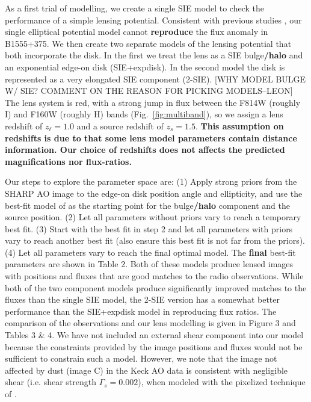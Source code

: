 \documentclass[useAMS,usenatbib]{mn2e}
\begin{document}
As a first trial of modelling, we create a single SIE model to check
the performance of a simple lensing potential. Consistent with
previous studies \citep{Marlow99, Xu14}, our single elliptical
potential model cannot \textbf{reproduce} the flux anomaly in B1555+375.  We then
create two separate models of the lensing potential that both
incorporate the disk.  In the first we treat the lens as a SIE bulge\textbf{/halo}
and an exponential edge-on disk (SIE+expdisk).  In the second model
the disk is represented as a very elongated SIE component (2-SIE). [WHY MODEL BULGE W/ SIE? COMMENT ON THE REASON FOR PICKING MODELS--LEON]
The lens system is red, with a strong jump in flux between the F814W
(roughly I) and F160W (roughly H) bands (Fig.~\ref{fig:multiband}), so
we assign a lens redshift of $z_\ell = 1.0$ and a source redshift of
$z_s =1.5$. \textbf{This assumption on redshifts is due to that some lens model parameters contain distance information. Our choice of redshifts does not affects the predicted magnifications nor flux-ratios.} 

Our steps to explore the parameter space are: (1) Apply
strong priors from the SHARP AO image to the edge-on disk position angle
and ellipticity, and use the best-fit model of \citet{Marlow99} as the
starting point for the bulge\textbf{/halo} component and the source position. (2)
Let all parameters without priors vary to reach a temporary best
fit. (3) Start with the best fit in step 2 and let all parameters with
priors vary to reach another best fit (also ensure this best fit is
not far from the priors). (4) Let all parameters vary to reach the
final optimal model.  The \textbf{final} best-fit parameters are shown in Table
2. Both of these models produce lensed images with positions and
fluxes that are good matches to the radio observations.  While both of
the two component models produce significantly improved matches to the
fluxes than the single SIE model, the 2-SIE version has a somewhat
better performance than the SIE+expdisk model in reproducing flux
ratios. The comparison of the observations and our lens modelling is
given in Figure 3 and Tables 3 \& 4.  We have not included an external
shear component into our model because the constraints provided by the
image positions and fluxes would not be sufficient to constrain such a
model. However, we note that the image not affected by dust (image C)
in the Keck AO data is consistent with negligible shear (i.e. shear
strength $\Gamma_s=0.002$), when modeled with the pixelized technique
of \citet{V09}.
\end{document}

